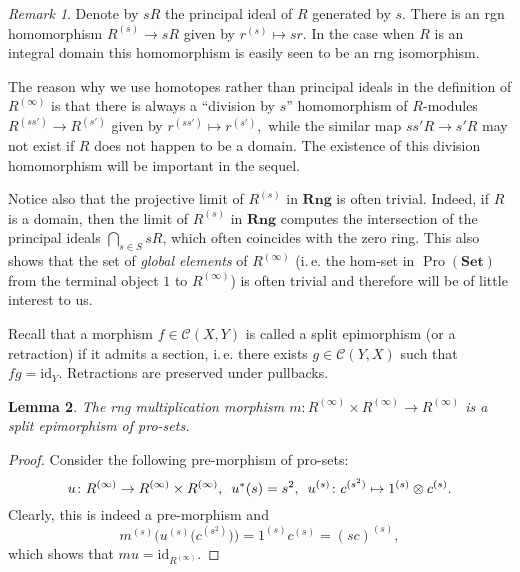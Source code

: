 \documentclass{article}
\newtheorem{lemma}{Lemma} \numberwithin{lemma}{section}
\theoremstyle{definition}
\theoremstyle{remark}
\newtheorem{rem}[lemma]{Remark}
\DeclareMathOperator{\Pro}{Pro}
\newcommand{\Set}{\mathbf{Set}}
\newcommand{\Rng}{\mathbf{Rng}}
\begin{document}
\begin{rem}\label{rem:prorings-comment}
 Denote by $sR$ the principal ideal of $R$ generated by $s$. 
 There is an rgn homomorphism $R^{(s)} \to sR$ given by $r^{(s)}\mapsto sr$.
 In the case when $R$ is an integral domain this homomorphism is easily seen to be an rng isomorphism.
 
 The reason why we use homotopes rather than principal ideals in the definition of $R^{(\infty)}$ is that
 there is always a ``division by $s$'' homomorphism of $R$-modules $R^{(ss')} \to R^{(s')}$ given by $r^{(ss')} \mapsto r^{(s')},$
 while the similar map $ss'R \to s'R$ may not exist if $R$ does not happen to be a domain.
 The existence of this division homomorphism will be important in the sequel.
 
 Notice also that the projective limit of $R^{(s)}$ in $\Rng$ is often trivial.
 Indeed, if $R$ is a domain, then the limit of $R^{(s)}$ in $\Rng$ computes the intersection of the principal ideals $\bigcap_{s\in S} sR$, which often coincides with the zero ring. 
 This also shows that the set of {\it global elements} of $R^{(\infty)}$ (i.\,e. the hom-set in $\Pro(\Set)$ from the terminal object $1$ to $R^{(\infty)}$) is often trivial and therefore will be of little interest to us.
\end{rem}

Recall that a morphism \(f \in \mathcal C(X, Y)\) is called a split epimorphism (or a retraction) if it admits a section,
 i.\,e. there exists $g \in \mathcal{C}(Y, X)$ such that $fg = \mathrm{id}_{Y}$. Retractions are preserved under pullbacks.

\begin{lemma}\label{RingGeneration}
The rng multiplication morphism $m \colon R^{(\infty)} \times R^{(\infty)} \to R^{(\infty)}$ is a split epimorphism of pro-sets.
\end{lemma}
\begin{proof}
Consider the following pre-morphism of pro-sets:
\[u \colon R^{(\infty)} \to R^{(\infty)} \times R^{(\infty)}, \enskip u^*(s) = s^2, \enskip u^{(s)} \colon c^{(s^2)} \mapsto 1^{(s)} \otimes c^{(s)}.\]
Clearly, this is indeed a pre-morphism and
\[m^{(s)}\bigl(u^{(s)}\bigl(c^{(s^2)}\bigr)\bigr) = 1^{(s)} c^{(s)} = (sc)^{(s)},\]
which shows that $mu = \mathrm{id}_{R^{(\infty)}}$.
\end{proof}
\end{document}
